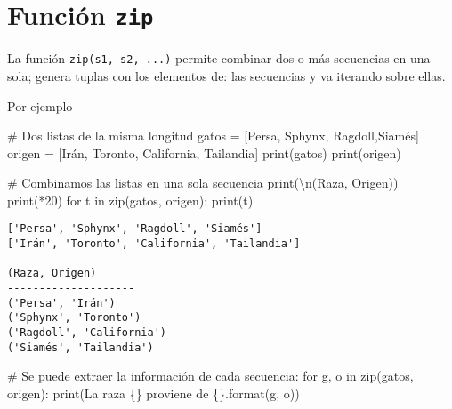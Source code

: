 \documentclass[
  letterpaper,
  DIV=11,
  numbers=noendperiod]{scrreprt}
\newenvironment{Shaded}{\begin{snugshade}}{\end{snugshade}}
\newcommand{\BuiltInTok}[1]{\textcolor[rgb]{0.00,0.23,0.31}{#1}}
\newcommand{\CharTok}[1]{\textcolor[rgb]{0.13,0.47,0.30}{#1}}
\newcommand{\CommentTok}[1]{\textcolor[rgb]{0.37,0.37,0.37}{#1}}
\newcommand{\ControlFlowTok}[1]{\textcolor[rgb]{0.00,0.23,0.31}{#1}}
\newcommand{\DecValTok}[1]{\textcolor[rgb]{0.68,0.00,0.00}{#1}}
\newcommand{\KeywordTok}[1]{\textcolor[rgb]{0.00,0.23,0.31}{#1}}
\newcommand{\NormalTok}[1]{\textcolor[rgb]{0.00,0.23,0.31}{#1}}
\newcommand{\OperatorTok}[1]{\textcolor[rgb]{0.37,0.37,0.37}{#1}}
\newcommand{\SpecialCharTok}[1]{\textcolor[rgb]{0.37,0.37,0.37}{#1}}
\newcommand{\StringTok}[1]{\textcolor[rgb]{0.13,0.47,0.30}{#1}}
\begin{document}
\section{\texorpdfstring{Función
\texttt{zip}}{Función zip}}\label{funciuxf3n-zip}

La función \texttt{zip(s1,\ s2,\ ...)} permite combinar dos o más
secuencias en una sola; genera tuplas con los elementos de: las
secuencias y va iterando sobre ellas.

Por ejemplo

\begin{Shaded}
\begin{Highlighting}[]
\CommentTok{\# Dos listas de la misma longitud}
\NormalTok{gatos }\OperatorTok{=}\NormalTok{ [}\StringTok{\textquotesingle{}Persa\textquotesingle{}}\NormalTok{, }\StringTok{\textquotesingle{}Sphynx\textquotesingle{}}\NormalTok{, }\StringTok{\textquotesingle{}Ragdoll\textquotesingle{}}\NormalTok{,}\StringTok{\textquotesingle{}Siamés\textquotesingle{}}\NormalTok{]}
\NormalTok{origen }\OperatorTok{=}\NormalTok{ [}\StringTok{\textquotesingle{}Irán\textquotesingle{}}\NormalTok{, }\StringTok{\textquotesingle{}Toronto\textquotesingle{}}\NormalTok{, }\StringTok{\textquotesingle{}California\textquotesingle{}}\NormalTok{, }\StringTok{\textquotesingle{}Tailandia\textquotesingle{}}\NormalTok{]}
\BuiltInTok{print}\NormalTok{(gatos)}
\BuiltInTok{print}\NormalTok{(origen)}

\CommentTok{\# Combinamos las listas en una sola secuencia}
\BuiltInTok{print}\NormalTok{(}\StringTok{\textquotesingle{}}\CharTok{\textbackslash{}n}\StringTok{(Raza, Origen)\textquotesingle{}}\NormalTok{)}
\BuiltInTok{print}\NormalTok{(}\StringTok{\textquotesingle{}{-}\textquotesingle{}}\OperatorTok{*}\DecValTok{20}\NormalTok{)}
\ControlFlowTok{for}\NormalTok{ t }\KeywordTok{in} \BuiltInTok{zip}\NormalTok{(gatos, origen):}
    \BuiltInTok{print}\NormalTok{(t)}
\end{Highlighting}
\end{Shaded}

\begin{verbatim}
['Persa', 'Sphynx', 'Ragdoll', 'Siamés']
['Irán', 'Toronto', 'California', 'Tailandia']

(Raza, Origen)
--------------------
('Persa', 'Irán')
('Sphynx', 'Toronto')
('Ragdoll', 'California')
('Siamés', 'Tailandia')
\end{verbatim}

\begin{Shaded}
\begin{Highlighting}[]
\CommentTok{\# Se puede extraer la información de cada secuencia:}
\ControlFlowTok{for}\NormalTok{ g, o }\KeywordTok{in} \BuiltInTok{zip}\NormalTok{(gatos, origen):}
    \BuiltInTok{print}\NormalTok{(}\StringTok{\textquotesingle{}La raza }\SpecialCharTok{\{\}}\StringTok{ proviene de }\SpecialCharTok{\{\}}\StringTok{\textquotesingle{}}\NormalTok{.}\BuiltInTok{format}\NormalTok{(g, o))}
\end{Highlighting}
\end{Shaded}
\end{document}
